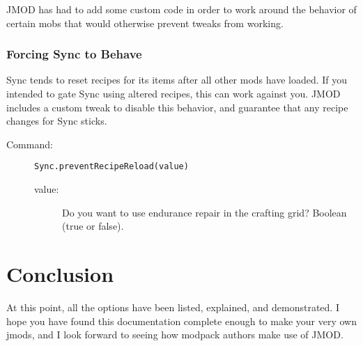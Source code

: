 \documentclass[letterpaper,titlepage,12pt]{article}
\begin{document}
JMOD has had to add some custom code in order to work around the behavior of certain mobs that would otherwise prevent tweaks from working.

\subsubsection{Forcing Sync to Behave}

Sync tends to reset recipes for its items after all other mods have loaded.  If you intended to gate Sync using altered recipes, this can work against you.  JMOD includes a custom tweak to disable this behavior, and guarantee that any recipe changes for Sync sticks.

\begin{description}
\item[Command:] \texttt{Sync.preventRecipeReload(value)}
\begin{description}
\item [value:] Do you want to use endurance repair in the crafting grid?  Boolean (true or false).
\end{description}
\end{description}

\section*{Conclusion}

At this point, all the options have been listed, explained, and demonstrated.  I hope you have found this documentation complete enough to make your very own jmods, and I look forward to seeing how modpack authors make use of JMOD.
\end{document}
